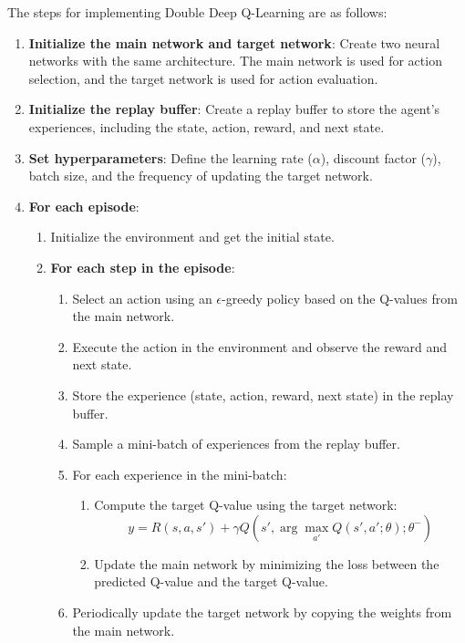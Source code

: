 \documentclass{article}
\begin{document}
The steps for implementing Double Deep Q-Learning are as follows:

\begin{enumerate}
    \item \textbf{Initialize the main network and target network}: Create two neural networks with the same architecture. The main network is used for action selection, and the target network is used for action evaluation.
    \item \textbf{Initialize the replay buffer}: Create a replay buffer to store the agent's experiences, including the state, action, reward, and next state.
    \item \textbf{Set hyperparameters}: Define the learning rate (\(\alpha\)), discount factor (\(\gamma\)), batch size, and the frequency of updating the target network.
    \item \textbf{For each episode}:
    \begin{enumerate}
        \item Initialize the environment and get the initial state.
        \item \textbf{For each step in the episode}:
        \begin{enumerate}
            \item Select an action using an \(\epsilon\)-greedy policy based on the Q-values from the main network.
            \item Execute the action in the environment and observe the reward and next state.
            \item Store the experience (state, action, reward, next state) in the replay buffer.
            \item Sample a mini-batch of experiences from the replay buffer.
            \item For each experience in the mini-batch:
            \begin{enumerate}
                \item Compute the target Q-value using the target network:
                \[
                y = R(s, a, s') + \gamma Q(s', \arg\max_{a'} Q(s', a'; \theta); \theta^-)
                \]
                \item Update the main network by minimizing the loss between the predicted Q-value and the target Q-value.
            \end{enumerate}
            \item Periodically update the target network by copying the weights from the main network.
        \end{enumerate}
    \end{enumerate}
\end{enumerate}
\end{document}
